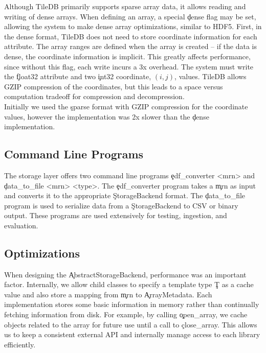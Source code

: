 Although TileDB primarily supports sparse array data, it allows reading and
writing of dense arrays. When defining an array, a special \c{dense} flag may
be set, allowing the system to make dense array optimizations, similar to HDF5.
First, in the dense format, TileDB does not need to store coordinate
information for each attribute. The array ranges are defined when the array is
created -- if the data is dense, the coordinate information is implicit. This
greatly affects performance, since without this flag, each write incurs a 3x
overhead.  The system must write the \c{float32} attribute and two \c{int32}
coordinate, $(i,j)$, values. TileDB allows GZIP compression of the coordinates,
but this leads to a space versus computation tradeoff for compression and
decompression. \\

Initially we used the \c{sparse} format with GZIP compression for the
coordinate values, however the implementation was 2x slower than the \c{dense}
implementation.

\subsection{Command Line Programs}\label{storage-ch:implementation-cmd}

The storage layer offers two command line programs \c{edf\_converter <mrn>} and
\c{data\_to\_file <mrn> <type>}. The \c{edf\_converter} program takes a \c{mrn}
as input and converts it to the appropriate \c{StorageBackend} format. The
\c{data\_to\_file} program is used to serialize data from a \c{StorageBackend}
to CSV or binary output. These programs are used extensively for testing,
ingestion, and evaluation.

\subsection{Optimizations}\label{storage-ch:opt}

When designing the \c{AbstractStorageBackend}, performance was an important
factor. Internally, we allow child classes to specify a template type \c{T} as
a cache value and also store a mapping from \c{mrn} to \c{ArrayMetadata}. Each
implementation stores some basic information in memory rather than continually
fetching information from disk.  For example, by calling \c{open\_array}, we
cache objects related to the array for future use until a call to
\c{close\_array}. This allows us to keep a consistent external API and
internally manage access to each library efficiently.

